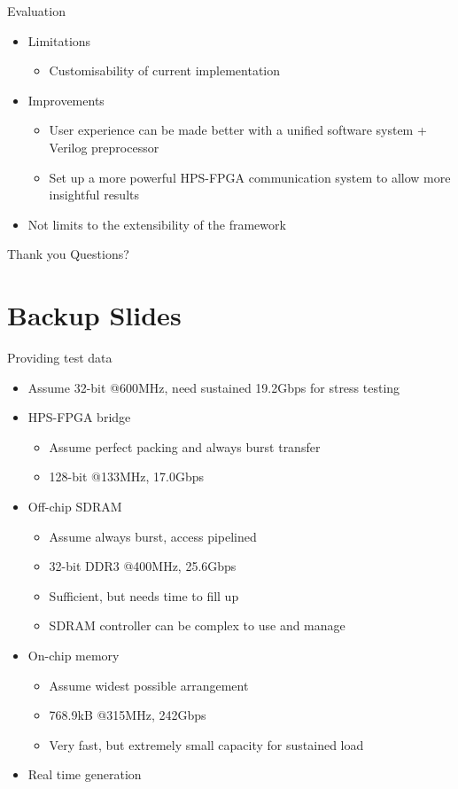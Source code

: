 \documentclass[t]{beamer}
\begin{document}
\begin{frame}{Evaluation}
\begin{itemize}
  \item<+-> Limitations
  \begin{itemize}
    \item Customisability of current implementation
  \end{itemize}
  \item<+-> Improvements
  \begin{itemize}
    \item User experience can be made better with a unified software system + Verilog preprocessor
    \item Set up a more powerful HPS-FPGA communication system to allow more insightful results \newline
  \end{itemize}
  \item<+-> Not limits to the extensibility of the framework
\end{itemize}
\end{frame}

\begin{frame}{Thank you}
  Questions?
\end{frame}

\section{Backup Slides}

\begin{frame}{Providing test data}
  \begin{itemize}
    \item Assume 32-bit @600MHz, need sustained 19.2Gbps for stress testing
    \item HPS-FPGA bridge
    \begin{itemize}
      \item Assume perfect packing and always burst transfer
      \item 128-bit @133MHz, 17.0Gbps
    \end{itemize}
    \item Off-chip SDRAM
    \begin{itemize}
      \item Assume always burst, access pipelined
      \item 32-bit DDR3 @400MHz, 25.6Gbps
      \item Sufficient, but needs time to fill up
      \item SDRAM controller can be complex to use and manage
    \end{itemize}
    \item On-chip memory
    \begin{itemize}
      \item Assume widest possible arrangement
      \item 768.9kB @315MHz, 242Gbps
      \item Very fast, but extremely small capacity for sustained load
    \end{itemize}
    \item Real time generation
  \end{itemize}
\end{frame}
\end{document}
